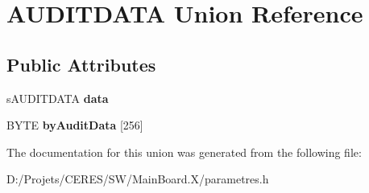 \hypertarget{union_a_u_d_i_t_d_a_t_a}{}\section{A\+U\+D\+I\+T\+D\+A\+T\+A Union Reference}
\label{union_a_u_d_i_t_d_a_t_a}
\subsection*{Public Attributes}
\begin{DoxyCompactItemize}
\item 
\hypertarget{union_a_u_d_i_t_d_a_t_a_ab5ab25661d435cecd5e3a6e7414f93d1}{}s\+A\+U\+D\+I\+T\+D\+A\+T\+A {\bfseries data}\label{union_a_u_d_i_t_d_a_t_a_ab5ab25661d435cecd5e3a6e7414f93d1}

\item 
\hypertarget{union_a_u_d_i_t_d_a_t_a_a126a5fb5ddaa78b34c80a7d303919d82}{}B\+Y\+T\+E {\bfseries by\+Audit\+Data} \mbox{[}256\mbox{]}\label{union_a_u_d_i_t_d_a_t_a_a126a5fb5ddaa78b34c80a7d303919d82}

\end{DoxyCompactItemize}


The documentation for this union was generated from the following file\+:\begin{DoxyCompactItemize}
\item 
D\+:/\+Projets/\+C\+E\+R\+E\+S/\+S\+W/\+Main\+Board.\+X/parametres.\+h\end{DoxyCompactItemize}
